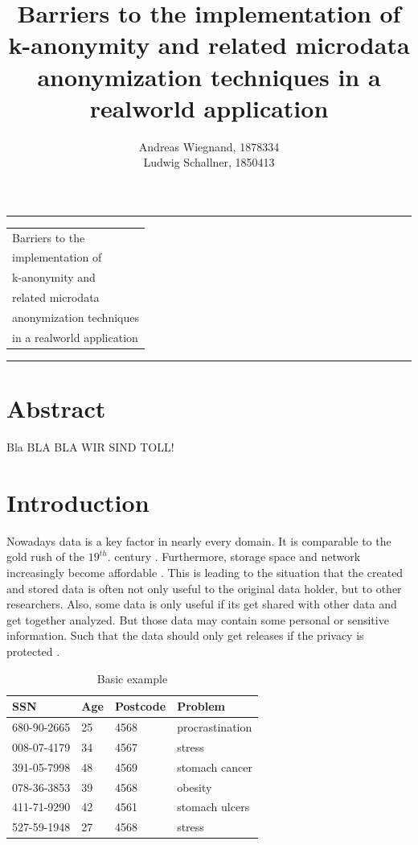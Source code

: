 \documentclass{llncs}
\begin{document}
\thispagestyle{empty}
\rule{\textwidth}{1pt}
\vspace{2pt}
\begin{flushright}
\Huge
\begin{tabular}{@{}l}
Barriers to the\\
implementation of\\
k-anonymity and\\
related microdata\\
anonymization techniques\\
in a realworld application\\[6pt]

\end{tabular}
\end{flushright}
\rule{\textwidth}{1pt}
\vfill
\title{Barriers to the implementation of k-anonymity and related microdata anonymization techniques in a realworld application}
\author{Andreas Wiegnand, 1878334\\
	Ludwig Schallner, 1850413}
\institute{}
\maketitle
%
\section{Abstract}
Bla BLA BLA WIR SIND TOLL!
\newpage
\setcounter{page}{1}

\section{Introduction}
%
Nowadays data is a key factor in nearly every domain. It is comparable to the gold rush of the \ensuremath{19^{th}.} century \cite{datarevo}. Furthermore, storage space and network increasingly become affordable \cite{sweeney2002k}. 
This is leading to the situation that the created and stored data is often not only useful to the original data holder, but to other researchers. Also, some data is only useful if its get shared with other data and get together analyzed. But those data may contain some personal or sensitive information. Such that the data should only get releases if the privacy is protected \cite{li2006achieving}.\\
\begin{table}[]
	\centering
	\caption{Basic example}
	\label{intro_example}
	\begin{tabular}{@{}llll@{}}
		\toprule
		SSN         & Age & Postcode & Problem         \\ \midrule
		680-90-2665 & 25  & 4568     & procrastination \\
		008-07-4179 & 34  & 4567     & stress          \\
		391-05-7998 & 48  & 4569     & stomach cancer  \\
		078-36-3853 & 39  & 4568     & obesity         \\
		411-71-9290 & 42  & 4561     & stomach ulcers  \\
		527-59-1948 & 27  & 4568     & stress          \\ \bottomrule
	\end{tabular}
\end{table}
\end{document}
